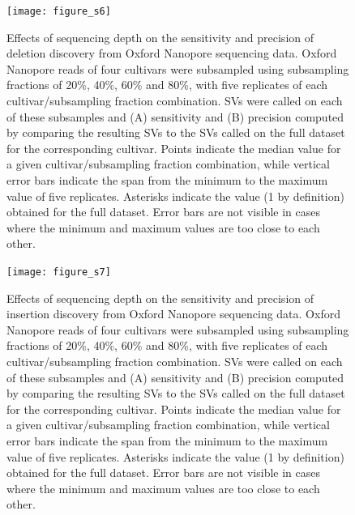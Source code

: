 \documentclass[12pt]{article}
\newenvironment{cfigure}
	{\begin{figure} \centering}
	{\end{figure}}
\begin{document}
\clearpage%

\begin{cfigure}
	\texttt{[image: figure\_s6]}

	\caption[Effects of sequencing depth on the sensitivity and precision of deletion discovery from Oxford Nanopore sequencing data]{
		Effects of sequencing depth on the sensitivity and precision of deletion discovery from Oxford Nanopore sequencing data.
		Oxford Nanopore reads of four cultivars were subsampled using subsampling fractions of 20\%, 40\%, 60\% and 80\%, with five replicates of each cultivar/subsampling fraction combination.
		SVs were called on each of these subsamples and (A) sensitivity and (B) precision computed by comparing the resulting SVs to the SVs called on the full dataset for the corresponding cultivar.
		Points indicate the median value for a given cultivar/subsampling fraction combination, while vertical error bars indicate the span from the minimum to the maximum value of five replicates.
		Asterisks indicate the value (1 by definition) obtained for the full dataset.
		Error bars are not visible in cases where the minimum and maximum values are too close to each other.
}

\label{fig_s6}

\end{cfigure}

\clearpage%

\begin{cfigure}
	\texttt{[image: figure\_s7]}

	\caption[Effects of sequencing depth on the sensitivity and precision of insertion discovery from Oxford Nanopore sequencing data]{
		Effects of sequencing depth on the sensitivity and precision of insertion discovery from Oxford Nanopore sequencing data.
		Oxford Nanopore reads of four cultivars were subsampled using subsampling fractions of 20\%, 40\%, 60\% and 80\%, with five replicates of each cultivar/subsampling fraction combination.
		SVs were called on each of these subsamples and (A) sensitivity and (B) precision computed by comparing the resulting SVs to the SVs called on the full dataset for the corresponding cultivar.
		Points indicate the median value for a given cultivar/subsampling fraction combination, while vertical error bars indicate the span from the minimum to the maximum value of five replicates.
		Asterisks indicate the value (1 by definition) obtained for the full dataset.
		Error bars are not visible in cases where the minimum and maximum values are too close to each other.
}

\label{fig_s7}

\end{cfigure}
\end{document}
